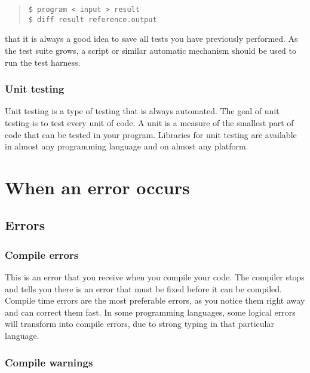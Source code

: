 \documentclass[11pt,a4paper,twoside]{article}
\begin{document}
\begin{quote}
\begin{verbatim}
$ program < input > result
$ diff result reference.output 
\end{verbatim}
\end{quote}

 that it is always a good idea to save all tests you have previously
performed. As the test suite grows, a script or similar automatic mechanism
should be used to run the test harness. 

\subsubsection{Unit testing}

Unit testing is a type of testing that is always automated. The goal of unit
testing is to test every unit of code. A unit is a measure of the smallest part
of code that can be tested in your program. Libraries for unit testing are
available in almost any programming language and on almost any platform.


\section{When an error occurs}

\subsection{Errors}

\subsubsection{Compile errors}

This is an error that you receive when you compile your code. The compiler
stops and tells you there is an error that must be fixed before it can be
compiled. Compile time errors are the most preferable errors, as you notice
them right away and can correct them fast. In some programming languages, some
logical errors will transform into compile errors, due to strong typing in that
particular language. 

\subsubsection{Compile warnings}
\end{document}
